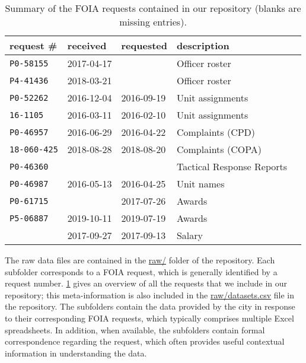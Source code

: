 \begin{table}[h]
	\begin{center}
\begin{tabular}{@{}lllll@{}}
	\toprule
	request \#&received&requested&description\\
\midrule
	\texttt{P0-58155}&2017-04-17& &Officer roster\\
	\texttt{P4-41436}&2018-03-21& &Officer roster\\
	\texttt{P0-52262}&2016-12-04&2016-09-19&Unit assignments\\
	\texttt{16-1105}&2016-03-11&2016-02-10&Unit assignments\\
	\texttt{P0-46957}&2016-06-29&2016-04-22&Complaints (CPD)\\
	\texttt{18-060-425}&2018-08-28&2018-08-20&Complaints (COPA)\\
	\texttt{P0-46360}& & &Tactical Response Reports\\
	\texttt{P0-46987}&2016-05-13&2016-04-25&Unit names\\
	\texttt{P0-61715}& &2017-07-26&Awards\\
	\texttt{P5-06887}&2019-10-11&2019-07-19&Awards\\
	&2017-09-27&2017-09-13&Salary\\
\bottomrule
\end{tabular}
\caption{Summary of the FOIA requests contained in our repository (blanks are missing entries).}
\label{table:summary}
\end{center}
\end{table}

The raw data files are contained in the \url{raw/} folder of the
repository. Each subfolder corresponds to a FOIA request, which is
generally identified by a request number. \cref{table:summary} gives
an overview of all the requests that we include in
our repository; this meta-information is also included in the \url{raw/datasets.csv}
file in the repository. The subfolders contain the data provided by the city
in response to their corresponding FOIA requests, which typically comprises multiple
Excel spreadsheets. In addition, when available, the subfolders contain formal correspondence 
regarding the request, which often provides useful contextual information in understanding the data.  

